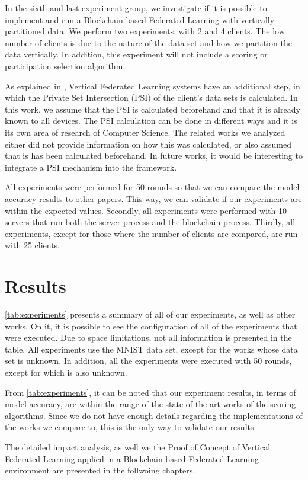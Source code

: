 In the sixth and last experiment group, we investigate if it is possible to implement and run a Blockchain-based Federated Learning with vertically partitioned data. We perform two experiments, with 2 and 4 clients. The low number of clients is due to the nature of the data set and how we partition the data vertically. In addition, this experiment will not include a scoring or participation selection algorithm.

As explained in , Vertical Federated Learning systems have an additional step, in which the Private Set Intersection (PSI) of the client's data sets is calculated. In this work, we assume that the PSI is calculated beforehand and that it is already known to all devices. The PSI calculation can be done in different ways and it is its own area of research of Computer Science. The related works we analyzed either did not provide information on how this was calculated, or also assumed that is has been calculated beforehand. In future works, it would be interesting to integrate a PSI mechanism into the framework.

All experiments were performed for 50 rounds so that we can compare the model accuracy results to other papers. This way, we can validate if our experiments are within the expected values. Secondly, all experiments were performed with 10 servers that run both the server process and the blockchain process. Thirdly, all experiments, except for those where the number of clients are compared, are run with 25 clients.

\section{Results}

\autoref{tab:experiments} presents a summary of all of our experiments, as well as other works. On it, it is possible to see the configuration of all of the experiments that were executed. Due to space limitations, not all information is presented in the table. All experiments use the MNIST data set, except for the works \cite{10.48550/arxiv.2007.03856, 10.48550/arxiv.2011.07516} whose data set is unknown. In addition, all the experiments were executed with 50 rounds, except for \cite{9170559} which is also unknown.

From \autoref{tab:experiments}, it can be noted that our experiment results, in terms of model accuracy, are within the range of the state of the art works of the scoring algorithms. Since we do not have enough details regarding the implementations of the works we compare to, this is the only way to validate our results.

The detailed impact analysis, as well we the Proof of Concept of Vertical Federated Learning applied in a Blockchain-based Federated Learning environment are presented in the follwoing chapters.

